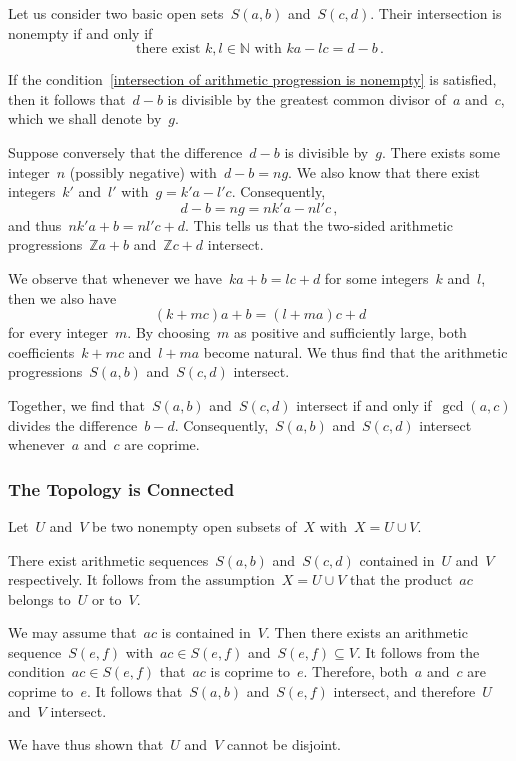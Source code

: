 Let us consider two basic open sets~$S(a, b)$ and~$S(c, d)$.
Their intersection is nonempty if and only if
\begin{equation}
	\label{intersection of arithmetic progression is nonempty}
	\text{there exist~$k, l ∈ ℕ$ with~$k a - l c = d - b$} \,.
\end{equation}

If the condition~\eqref{intersection of arithmetic progression is nonempty} is satisfied, then it follows that~$d - b$ is divisible by the greatest common divisor of~$a$ and~$c$, which we shall denote by~$g$.

Suppose conversely that the difference~$d - b$ is divisible by~$g$.
There exists some integer~$n$ (possibly negative) with~$d - b = n g$.
We also know that there exist integers~$k'$ and~$l'$ with~$g = k' a - l' c$.
Consequently,
\[
	d - b = n g = nk' a - nl' c  \,,
\]
and thus~$nk' a + b = nl' c + d$.
This tells us that the two-sided arithmetic progressions~$ℤ a + b$ and~$ℤ c + d$ intersect.

We observe that whenever we have~$k a + b = l c + d$ for some integers~$k$ and~$l$, then we also have
\[
	(k + m c) a + b = (l + m a) c + d
\]
for every integer~$m$.
By choosing~$m$ as positive and sufficiently large, both coefficients~$k + m c$ and~$l + m a$ become natural.
We thus find that the arithmetic progressions~$S(a, b)$ and~$S(c, d)$ intersect.

Together, we find that~$S(a, b)$ and~$S(c, d)$ intersect if and only if~$\gcd(a, c)$ divides the difference~$b - d$.
Consequently,~$S(a, b)$ and~$S(c, d)$ intersect whenever~$a$ and~$c$ are coprime.



\subsubsection{The Topology is Connected}

Let~$U$ and~$V$ be two nonempty open subsets of~$X$ with~$X = U ∪ V$.

There exist arithmetic sequences~$S(a, b)$ and~$S(c, d)$ contained in~$U$ and~$V$ respectively.
It follows from the assumption~$X = U ∪ V$ that the product~$a c$ belongs to~$U$ or to~$V$.

We may assume that~$a c$ is contained in~$V$.
Then there exists an arithmetic sequence~$S(e, f)$ with~$a c ∈ S(e, f)$ and~$S(e, f) ⊆ V$.
It follows from the condition~$a c ∈ S(e, f)$ that~$a c$ is coprime to~$e$.
Therefore, both~$a$ and~$c$ are coprime to~$e$.
It follows that~$S(a, b)$ and~$S(e, f)$ intersect, and therefore~$U$ and~$V$ intersect.

We have thus shown that~$U$ and~$V$ cannot be disjoint.
